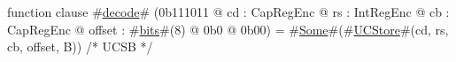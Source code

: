 function clause #\hyperref[zdecode]{decode}# (0b111011 @ cd : CapRegEnc @ rs : IntRegEnc @ cb : CapRegEnc @ offset : #\hyperref[zbits]{bits}#(8) @ 0b0 @ 0b00) = #\hyperref[zSome]{Some}#(#\hyperref[zUCStore]{UCStore}#(cd, rs, cb, offset, B)) /* UCSB */
